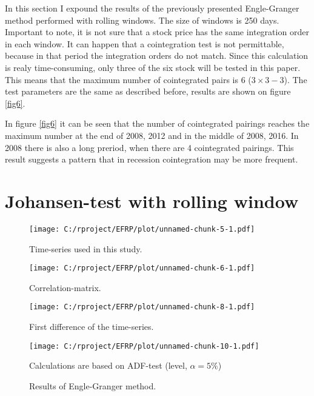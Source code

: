\documentclass[12pt, a4paper, twoside, titlepage]{article}
\begin{document}
In this section I expound the results of the previously presented Engle-Granger method performed with rolling windows. The size of windows is 250 days. Important to note, it is not sure that a stock price has the same integration order in each window. It can happen that a cointegration test is not permittable, because in that period the integration orders do not match. Since this calculation is realy time-consuming, only three of the six stock will be tested in this paper. This means that the maximum number of cointegrated pairs is 6 ($3 \times 3 - 3$). The test parameters are the same as described before, results are shown on figure \ref{fig6}.

In figure \ref{fig6} it can be seen that the number of cointegrated pairings reaches the maximum number at the end of 2008, 2012 and in the middle of 2008, 2016. In 2008 there is also a long preriod, when there are 4 cointegrated pairings. This result suggests a pattern that in recession cointegration may be more frequent.

\section*{Johansen-test with rolling window}



\begin{figure}[ht]
  \centering
  \texttt{[image: C:/rproject/EFRP/plot/unnamed-chunk-5-1.pdf]}
  \caption{Time-series used in this study.}
  \label{fig1}
\end{figure}

\begin{figure}[ht]
  \centering
  \texttt{[image: C:/rproject/EFRP/plot/unnamed-chunk-6-1.pdf]}
  \caption{Correlation-matrix.}
  \label{fig2}
\end{figure}

\begin{figure}[ht]
  \centering
  \texttt{[image: C:/rproject/EFRP/plot/unnamed-chunk-8-1.pdf]}
  \caption{First difference of the time-series.}
  \label{fig3}
\end{figure}

\begin{figure}[ht]
  \centering
  \texttt{[image: C:/rproject/EFRP/plot/unnamed-chunk-10-1.pdf]}
  \caption{Results of Engle-Granger method.}
  \label{fig4}
  Calculations are based on ADF-test (level, $\alpha = 5\%$)
\end{figure}
\end{document}
